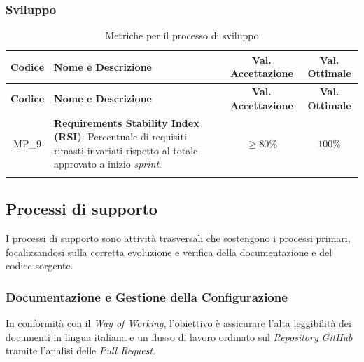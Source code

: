 \documentclass[12pt, a4paper]{article}
\newlength{\LargColVal} %
\begin{document}
\subsubsection{Sviluppo}
\renewcommand{\arraystretch}{1.3}
\begin{xltabular}{\textwidth}{|c|X|C{\LargColVal}|C{\LargColVal}|}

    \hline
    \textbf{Codice} & \textbf{Nome e Descrizione} & \textbf{Val. Accettazione} & \textbf{Val. Ottimale} \\ \hline
    \endfirsthead

    \hline
    \textbf{Codice} & \textbf{Nome e Descrizione} & \textbf{Val. Accettazione} & \textbf{Val. Ottimale} \\ \hline
    \endhead

    MP\_9 & \textbf{Requirements Stability Index (RSI)}: Percentuale di requisiti rimasti invariati rispetto al totale approvato a inizio \textit{sprint}. & $\ge 80\%$ & $100\%$ \\ \hline

    \caption{Metriche per il processo di sviluppo}
    \label{tab:metriche_sviluppo}
\end{xltabular}

\subsection{Processi di supporto}
I processi di supporto sono attività trasversali che sostengono i processi primari, focalizzandosi sulla corretta evoluzione e verifica della documentazione e del codice sorgente.

\subsubsection{Documentazione e Gestione della Configurazione}
In conformità con il \textit{Way of Working}, l'obiettivo è assicurare l'alta leggibilità dei documenti in lingua italiana e un flusso di lavoro ordinato sul \textit{Repository} \textit{GitHub} tramite l'analisi delle \textit{Pull Request}.
\end{document}

